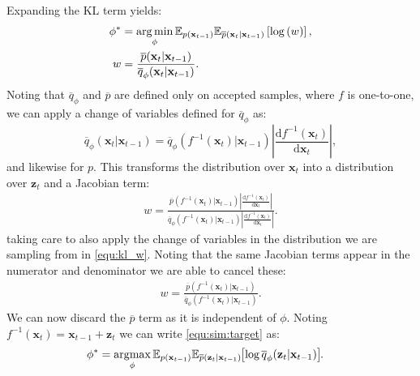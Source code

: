 Expanding the KL term yields:
\begin{align}
\phi^* &= \operatorname*{arg\,min}_{\phi} \mathbb{E}_{p(\mathbf{x}_{t-1})} \mathbb{E}_{\overline{p}(\mathbf{x}_t | \mathbf{x}_{t-1})} \left[ \log\left( w \right) \right], \label{equ:kl_w}\\
w &= \frac{\overline{p}(\mathbf{x}_t | \mathbf{x}_{t-1})}{\overline{q}_{\phi}(\mathbf{x}_t | \mathbf{x}_{t-1})}.
\end{align}
Noting that $\overline{q}_{\phi}$ and $\overline{p}$ are defined only on accepted samples, where $f$ is one-to-one, we can apply a change of variables defined for $\overline{q}_{\phi}$ as:
\begin{equation}
   \overline{q}_{\phi}(\mathbf{x}_t | \mathbf{x}_{t-1}) = \overline{q}_{\phi} ( f^{-1} (\mathbf{x}_{t}) | \mathbf{x}_{t-1})  \left| \frac{\text{d}f^{-1} (\mathbf{x}_{t})}{\text{d}\mathbf{x}_t} \right| , \label{equ:cov_definition}
\end{equation}
and likewise for $p$.
This transforms the distribution over $\mathbf{x}_{t}$ into a distribution over $\mathbf{z}_{t}$ and a Jacobian term:
\begin{align}
w = \frac{\overline{p} (f^{-1} (\mathbf{x}_{t}) | \mathbf{x}_{t-1})  \left| \frac{\text{d}f^{-1} (\mathbf{x}_{t})}{\text{d}\mathbf{x}_t} \right|} {\overline{q}_{\phi} (f^{-1} (\mathbf{x}_{t}) | \mathbf{x}_{t-1})  \left| \frac{\text{d}f^{-1} (\mathbf{x}_{t})}{\text{d}\mathbf{x}_t} \right|}.
\end{align}
taking care to also apply the change of variables in the distribution we are sampling from in \eqref{equ:kl_w}.
Noting that the same Jacobian terms appear in the numerator and denominator we are able to cancel these:
\begin{align}
w = \frac{\overline{p} (f^{-1} (\mathbf{x}_{t}) | \mathbf{x}_{t-1}) } {\overline{q}_{\phi} (f^{-1} (\mathbf{x}_{t}) | \mathbf{x}_{t-1}) }.
\end{align}
We can now discard the $\overline{p}$ term as it is independent of $\phi$.
Noting $f^{-1}(\mathbf{x}_t) = \mathbf{x}_{t-1} + \mathbf{z}_t$ we can write \eqref{equ:sim:target} as:
\begin{align}
\phi^* &=  \argmax_{\phi} \mathbb{E}_{p(\mathbf{x}_{t-1})} \mathbb{E}_{\overline{p}(\mathbf{z}_t | \mathbf{x}_{t-1})} \hspace*{-0.1cm}\left[ \log \overline{q}_{\phi}(\mathbf{z}_t |  \mathbf{x}_{t-1}) \right]\hspace*{-0.1cm}.\label{equ:sim:p_bar_target}
\end{align}
